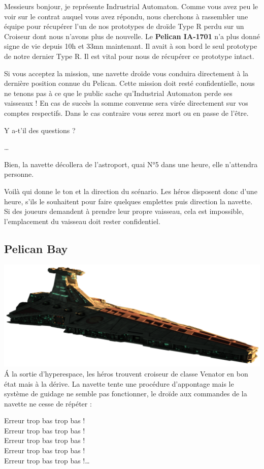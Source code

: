 \begin{quotebox}
	Messieurs bonjour, je représente Indrustrial Automaton.
	Comme vous avez peu le voir sur le contrat auquel vous avez répondu, nous cherchons à rassembler une équipe pour récupérer l’un de nos prototypes de droïde Type R perdu sur un Croiseur dont nous n’avons plus de nouvelle.
	Le \textbf{Pelican IA-1701} n’a plus donné signe de vie depuis 10h et 33mn maintenant. Il avait à son bord le seul prototype de notre dernier Type R. Il est vital pour nous de récupérer ce prototype intact.

	Si vous acceptez la mission, une navette droïde vous conduira directement à la dernière position connue du Pelican. Cette mission doit resté confidentielle, nous ne tenons pas à ce que le public sache qu’Industrial Automaton perde ses vaisseaux !
	En cas de succès la somme convenue sera virée directement sur vos comptes respectifs. Dans le cas contraire vous serez mort ou en passe de l’être.

	Y a-t’il des questions ?

	\ldots

	Bien, la navette décollera de l’astroport, quai N°5 dans une heure, elle n’attendra personne.
\end{quotebox}

Voilà qui donne le ton et la direction du scénario. Les héros disposent donc d’une heure, s’ils le souhaitent pour faire quelques emplettes puis direction la navette. Si des joueurs demandent à prendre leur propre vaisseau, cela est impossible, l'emplacement du vaisseau doit rester confidentiel.

\subsection{Pelican Bay}
\includegraphics[width=\linewidth]{_img/dos-au-muur/venator.png}
\'A la sortie d’hyperespace, les héros trouvent croiseur de classe Venator en bon état mais à la dérive. La navette tente une procédure d’appontage mais le système de guidage ne semble pas fonctionner, le droïde aux commandes de la navette ne cesse de répéter :
\begin{quotebox}
	Erreur trop bas trop bas !\\
	Erreur trop bas trop bas !\\
	Erreur trop bas trop bas !\\
	Erreur trop bas trop bas !\\
	Erreur trop bas trop bas !\ldots
\end{quotebox}

